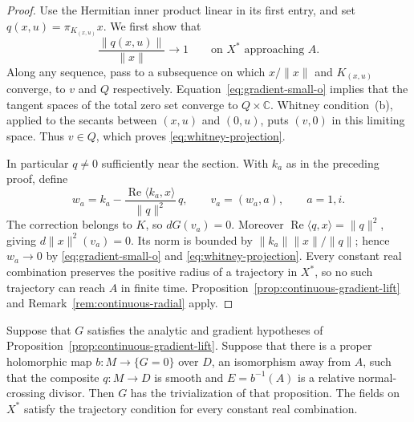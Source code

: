 \begin{proof}
Use the Hermitian inner product linear in its first entry, and set
$q(x,u)=\pi_{K_{(x,u)}}x$.  We first show that
\begin{equation}
\label{eq:whitney-projection}
 \frac{\|q(x,u)\|}{\|x\|}\longrightarrow1
 \qquad\text{on }X^*\text{ approaching }A.
\end{equation}
Along any sequence, pass to a subsequence on which $x/\|x\|$ and
$K_{(x,u)}$ converge, to $v$ and $Q$ respectively.
Equation~\eqref{eq:gradient-small-o} implies that the tangent spaces
of the total zero set converge to $Q\times\mathbb C$.
Whitney condition~(b), applied to the secants between $(x,u)$ and
$(0,u)$, puts $(v,0)$ in this limiting space.  Thus $v\in Q$, which
proves \eqref{eq:whitney-projection}.

In particular $q\ne0$ sufficiently near the section.  With $k_a$
as in the preceding proof, define
\[
 w_a=k_a-
      \frac{\operatorname{Re}\langle k_a,x\rangle}{\|q\|^2}\,q,
 \qquad v_a=(w_a,a),\qquad a=1,i.
\]
The correction belongs to $K$, so $dG(v_a)=0$.
Moreover $\operatorname{Re}\langle q,x\rangle=\|q\|^2$, giving
$d\|x\|^2(v_a)=0$.  Its norm is bounded by
$\|k_a\|\|x\|/\|q\|$; hence $w_a\to0$ by
\eqref{eq:gradient-small-o} and \eqref{eq:whitney-projection}.
Every constant real combination preserves the positive radius of a
trajectory in $X^*$, so no such trajectory can reach $A$ in finite
time.  Proposition~\ref{prop:continuous-gradient-lift} and
Remark~\ref{rem:continuous-radial} apply.
\end{proof}

\begin{corollary}
\label{cor:gradient-resolution}
Suppose that $G$ satisfies the analytic and gradient hypotheses of
Proposition~\ref{prop:continuous-gradient-lift}.  Suppose that there
is a proper holomorphic map $b:M\to\{G=0\}$ over $D$, an
isomorphism away from $A$, such that the composite $q:M\to D$ is
smooth and $E=b^{-1}(A)$ is a relative
normal-crossing divisor.  Then $G$ has the trivialization of that
proposition.  The fields on $X^*$ satisfy the trajectory condition
for every constant real combination.
\end{corollary}

